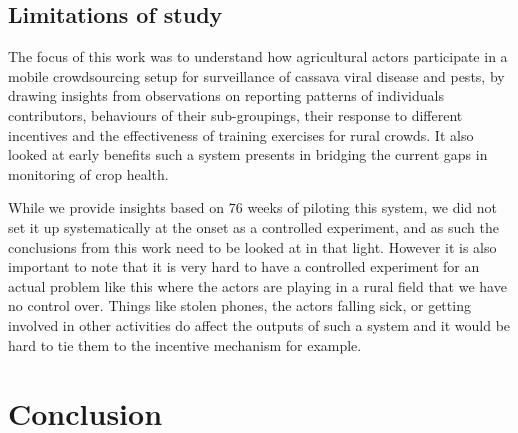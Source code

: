 \documentclass[letterpaper]{article} %
\begin{document}

\subsection{Limitations of study}
The focus of this work was to understand how agricultural actors participate in a mobile crowdsourcing setup for surveillance of cassava viral disease and pests, by drawing insights from observations on reporting patterns of individuals contributors, behaviours of  their sub-groupings, their response to different incentives and the effectiveness of training exercises for rural crowds. It also looked at early benefits such a system presents in bridging the current gaps in monitoring of crop health. 

While we provide insights based on 76 weeks of piloting this system, we did not set it up systematically at the onset as a controlled experiment, and as such the conclusions from this work need to be looked at in that light. However it is also important to note that it is very hard to have a controlled experiment for an actual problem like this where the actors are playing in a rural field that we have no control over. Things like stolen phones, the actors falling sick, or getting involved in other activities do affect the outputs of such a system and it would be hard to tie them to the incentive mechanism for example.


\section{Conclusion}
 
\end{document}
